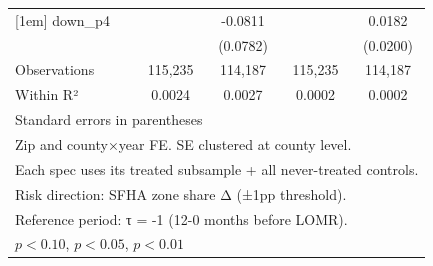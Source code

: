 \begin{table}[htbp]
\begin{tabular}{l*{4}{c}}
[1em]
down\_p4             &                     &     -0.0811         &                     &      0.0182         \\
                    &                     &    (0.0782)         &                     &    (0.0200)         \\
\hline
Observations        &     115,235         &     114,187         &     115,235         &     114,187         \\
Within R²           &      0.0024         &      0.0027         &      0.0002         &      0.0002         \\
\hline\hline
\multicolumn{5}{l}{\footnotesize Standard errors in parentheses}\\
\multicolumn{5}{l}{\footnotesize Zip and county×year FE. SE clustered at county level.}\\
\multicolumn{5}{l}{\footnotesize Each spec uses its treated subsample + all never-treated controls.}\\
\multicolumn{5}{l}{\footnotesize Risk direction: SFHA zone share Δ (±1pp threshold).}\\
\multicolumn{5}{l}{\footnotesize Reference period: τ = -1 (12-0 months before LOMR).}\\
\multicolumn{5}{l}{\footnotesize \sym{*} \(p<0.10\), \sym{**} \(p<0.05\), \sym{***} \(p<0.01\)}\\
\end{tabular}
\end{table}
